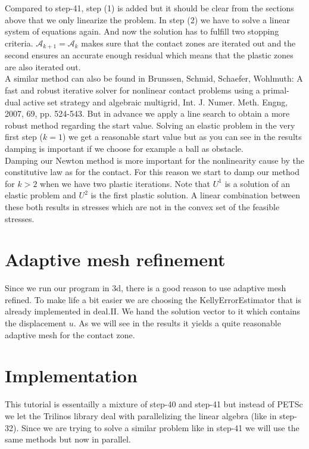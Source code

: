 \documentclass{article}
\begin{document}
Compared to step-41, step (1) is added but it should be clear from the sections
above that we only linearize the problem. In step (2) we have to solve a linear system of equations again. And now the solution has to fulfill two stopping
criteria. $\mathcal{A}_{k+1} = \mathcal{A}_k$ makes sure that the contact zones
are iterated out and the second ensures an accurate enough residual which means that the plastic zones are also iterated out.\\
A similar method can also be found in Brunssen, Schmid, Schaefer, Wohlmuth: A
fast and robust iterative solver for nonlinear contact problems using a 
primal-dual active set strategy and algebraic multigrid, Int. J. Numer.
Meth. Engng, 2007, 69, pp. 524-543. But in advance we apply a line search to
obtain a more robust method regarding the start value. Solving an elastic
problem in the very first step ($k=1$) we get a reasonable start value but as
you can see in the results damping is important if we choose for example a ball as
obstacle.\\
Damping our Newton method is more important for the nonlinearity cause by the
constitutive law as for the contact. For this reason we start to damp our method
for $k>2$ when we have two plastic iterations. Note that $U^1$ is a solution of
an elastic problem and $U^2$ is the first plastic solution. A linear combination
between these both results in stresses which are not in the convex set
of the feasible stresses.

\section{Adaptive mesh refinement}

Since we run our program in 3d, there is a good reason to use adaptive
mesh refined. To make life a bit easier we are choosing the
KellyErrorEstimator that is already implemented in deal.II. We hand the
solution vector to it which contains the displacement $u$. As we will see in the
results it yields a quite reasonable adaptive mesh for the contact zone.

\section{Implementation}

This tutorial is essentailly a mixture of step-40 and step-41 but instead of
PETSc we let the Trilinos library deal with parallelizing the linear algebra
(like in step-32). Since we are trying to solve a similar problem like in 
step-41 we will use the same methods but now in parallel.
\end{document}
